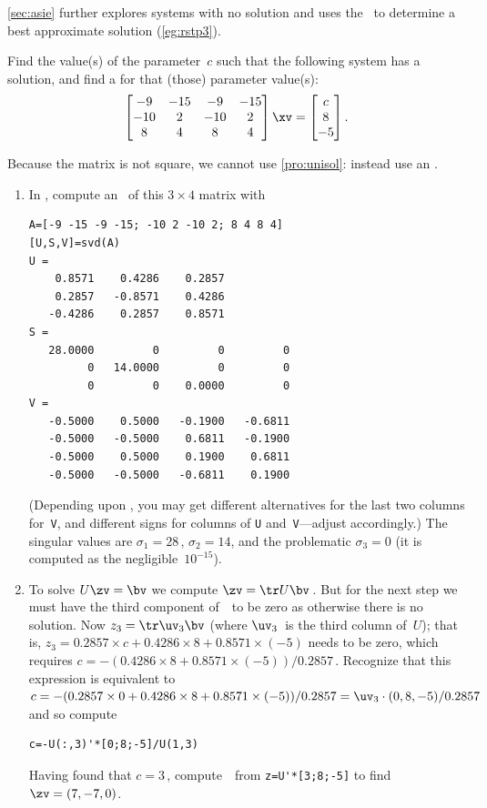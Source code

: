 \cref{sec:asie} further explores systems with no solution and uses the \svd\ to determine a best approximate solution (\cref{eg:rstp3}).



\begin{example} \label{eg:3x4findc}
Find the value(s) of the parameter~\(c\) such that the following system has a solution, and find a  for that (those) parameter value(s):
\begin{equation*}
\begin{bmatrix} -9&-15&-9&-15
\\-10&2&-10&2
\\8&4&8&4 \end{bmatrix}\xv=
\begin{bmatrix} c\\8\\-5 \end{bmatrix}.
\end{equation*}
\begin{solution} 
Because the matrix is not square, we cannot use \cref{pro:unisol}: instead use an \svd.
\begin{enumerate}
\item In \script, compute an \svd\  of this \(3\times 4\) matrix with 
\setbox\ajrqrbox\hbox{}%
\marginajrbox%
\begin{verbatim}
A=[-9 -15 -9 -15; -10 2 -10 2; 8 4 8 4]
[U,S,V]=svd(A)
U =
    0.8571    0.4286    0.2857
    0.2857   -0.8571    0.4286
   -0.4286    0.2857    0.8571
S =
   28.0000         0         0         0
         0   14.0000         0         0
         0         0    0.0000         0
V =
   -0.5000    0.5000   -0.1900   -0.6811
   -0.5000   -0.5000    0.6811   -0.1900
   -0.5000    0.5000    0.1900    0.6811
   -0.5000   -0.5000   -0.6811    0.1900
\end{verbatim}
(Depending upon \script, you may get different alternatives for the last two columns for~\texttt{V}, and different signs for columns of \texttt{U} and~\texttt{V}---adjust accordingly.)
The singular values are \(\sigma_1=28\)\,, \(\sigma_2=14\), and the problematic \(\sigma_3=0\) (it is computed as the negligible~\(10^{-15}\)).

\item To solve \(U\zv=\bv\) we compute \(\zv=\tr U\bv\)\,.  
But for the next step we must have the third component of~\zv\ to be zero as otherwise there is no solution.  
Now \(z_3=\tr\uv_3\bv\) (where \(\uv_3\)~is the third column of~\(U\)); that is, \(z_3=0.2857\times c +0.4286\times8 +0.8571\times(-5)\) needs to be zero, which requires \(c=-(0.4286\times8 +0.8571\times(-5))/0.2857\)\,.  
Recognize that this expression is equivalent to \(c=-(0.2857\times0+0.4286\times8 +0.8571\times(-5))/0.2857=\uv_3\cdot(0,8,-5)/0.2857\) and so compute
\begin{verbatim}
c=-U(:,3)'*[0;8;-5]/U(1,3)
\end{verbatim}
Having found that \(c=3\)\,, compute~\zv\ from \verb|z=U'*[3;8;-5]| to find \(\zv=(7,-7,0)\).


\end{enumerate}
\end{solution}
\end{example}
